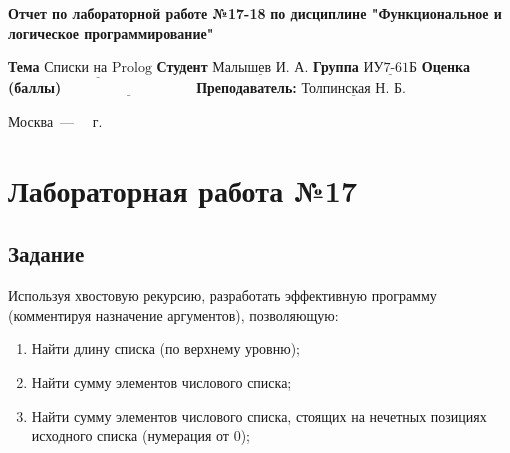 \documentclass[12pt]{report}
\begin{document}
\begin{titlepage}
		
		\begin{center}
			\noindent\begin{minipage}{1.3\textwidth}\centering
				\Large\textbf{  Отчет по лабораторной работе №17-18}\newline
				\textbf{по дисциплине \newline "Функциональное и логическое программирование"}\newline\newline
			\end{minipage}
		\end{center}
		
		\noindent\textbf{Тема} $\underline{\text{Списки на Prolog}}$\newline\newline
		\noindent\textbf{Студент} $\underline{\text{Малышев И. А.}}$\newline\newline
		\noindent\textbf{Группа} $\underline{\text{ИУ7-61Б}}$\newline\newline
		\noindent\textbf{Оценка (баллы)} $\underline{\text{~~~~~~~~~~~~~~~~~~~~~~~~~~~}}$\newline\newline
		\noindent\textbf{Преподаватель: } $\underline{\text{Толпинская Н. Б.}}$\newline\newline\newline
		
		\begin{center}
			\vfill
			Москва~---~\the\year
			~г.
		\end{center}
	\end{titlepage}
	
	
	\setcounter{page}{2}

\chapter*{Лабораторная работа №17}
\section*{Задание}

Используя хвостовую рекурсию, разработать эффективную программу (комментируя назначение аргументов), позволяющую:

\begin{enumerate}
	\item Найти длину списка (по верхнему уровню);
	\item Найти сумму элементов числового списка;
	\item Найти сумму элементов числового списка, стоящих на нечетных позициях исходного списка (нумерация от 0);
\end{enumerate}
\end{document}
